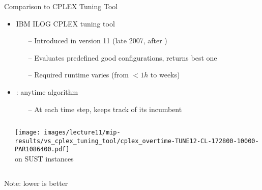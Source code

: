 \begin{frame}[c,fragile]{Comparison to CPLEX Tuning Tool}

\begin{itemize}

        \item IBM ILOG CPLEX tuning tool
        \begin{itemize}
                \item[--] Introduced in version 11 (late 2007, after \paramils{})
                \item[--] Evaluates predefined good configurations, returns best one
                \item[--] Required runtime varies (from $< 1h$ to weeks)
        \end{itemize}
        \item \paramils{}: anytime algorithm
        \begin{itemize}
                \item[--] At each time step, keeps track of its incumbent
        \end{itemize}
\end{itemize}

\vspace*{-0.5cm}

    \begin{columns}
                                \begin{center}          
                                \end{center}
                                \pause
                                \begin{center}          
\texttt{[image: images/lecture11/mip-results/vs\_cplex\_tuning\_tool/cplex\_overtime-TUNE12-CL-172800-10000-PAR1086400.pdf]}\\
                                \footnotesize{\cplex{} on SUST instances}%
                                \end{center}
    \end{columns}

\begin{center}
Note: lower is better
\end{center}
\end{frame}
